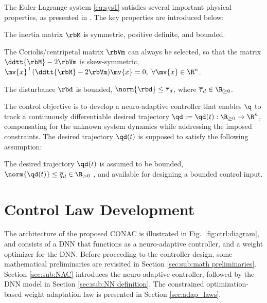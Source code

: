 \documentclass[journal]{IEEEtran}
\begin{document}
The Euler-Lagrange system \eqref{eq:sys1} satisfies several important physical properties, as presented in \cite[Chap. 3 Tab. 3.2.1]{Lewis:1998aa}. 
The key properties are introduced below:
\begin{prop} 
    The inertia matrix $\rbM$ is symmetric, positive definite, and bounded.
    \label{prop:M}
\end{prop}

\begin{prop} 
    The Coriolis/centripetal matrix $\rbVm$ can always be selected, so that the matrix $\ddtt{\rbM}-2\rbVm$ is skew-symmetric, \ie $\mv{x}^\top(\ddtt{\rbM}-2\rbVm)\mv{x}=0,\ \forall \mv{x}\in\R^n$.
    \label{prop:skew}
\end{prop}

\begin{prop}
    The disturbance $\rbd$ is bounded, \ie $\norm{\rbd}\le \overline\tau_d$, where $\overline\tau_d\in\R_{\ge0}$.
    \label{prop:dis_bound}
\end{prop}

The control objective is to develop a neuro-adaptive controller that enables $\q$ to track a continuously differentiable desired trajectory $\qd:=\qd(t): \R_{\ge0} \to \R^n$, compensating for the unknown system dynamics while addressing the imposed constraints.
The desired trajectory $\qd(t)$ is supposed to satisfy the following assumption:
\begin{assum}
    The desired trajectory $\qd(t)$ is assumed to be bounded, \ie $\norm{\qd(t)}\le \overline{q}_d\in\R_{>0}$ , and available for designing a bounded control input.
    \label{assum:feasible}
\end{assum}

\section{Control Law Development}\label{sec:ctrl design}

The architecture of the proposed CONAC is illustrated in Fig.~\ref{fig:ctrl:diagram}, and consists of a DNN that functions as a neuro-adaptive controller, and a weight optimizer for the DNN.
Before proceeding to the controller design, some mathematical preliminaries are revisited in Section \ref{sec:sub:math preliminaries}. 
Section \ref{sec:sub:NAC} introduces the neuro-adaptive controller, followed by the DNN model in Section \ref{sec:sub:NN definition}. 
The constrained optimization-based weight adaptation law is presented in Section \ref{sec:adap_laws}.
\end{document}
